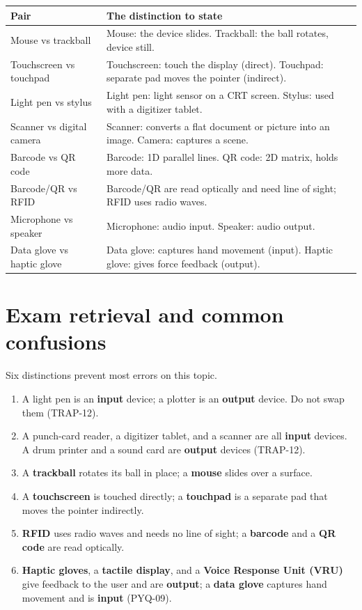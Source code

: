\documentclass[11pt]{article}
\begin{document}
\begin{center}
\begin{tabular}{p{}p{}}
\toprule
\textbf{Pair} & \textbf{The distinction to state} \\
\midrule
Mouse vs trackball & Mouse: the device slides. Trackball: the ball rotates, device still. \\
Touchscreen vs touchpad & Touchscreen: touch the display (direct). Touchpad: separate pad moves the pointer (indirect). \\
Light pen vs stylus & Light pen: light sensor on a CRT screen. Stylus: used with a digitizer tablet. \\
Scanner vs digital camera & Scanner: converts a flat document or picture into an image. Camera: captures a scene. \\
Barcode vs QR code & Barcode: 1D parallel lines. QR code: 2D matrix, holds more data. \\
Barcode/QR vs RFID & Barcode/QR are read optically and need line of sight; RFID uses radio waves. \\
Microphone vs speaker & Microphone: audio input. Speaker: audio output. \\
Data glove vs haptic glove & Data glove: captures hand movement (input). Haptic glove: gives force feedback (output). \\
\bottomrule
\end{tabular}
\end{center}

\section{Exam retrieval and common confusions}
Six distinctions prevent most errors on this topic.
\begin{enumerate}
  \item A light pen is an \textbf{input} device; a plotter is an \textbf{output}
    device. Do not swap them (TRAP-12).
  \item A punch-card reader, a digitizer tablet, and a scanner are all
    \textbf{input} devices. A drum printer and a sound card are
    \textbf{output} devices (TRAP-12).
  \item A \textbf{trackball} rotates its ball in place; a \textbf{mouse}
    slides over a surface.
  \item A \textbf{touchscreen} is touched directly; a \textbf{touchpad} is a
    separate pad that moves the pointer indirectly.
  \item \textbf{RFID} uses radio waves and needs no line of sight; a
    \textbf{barcode} and a \textbf{QR code} are read optically.
  \item \textbf{Haptic gloves}, a \textbf{tactile display}, and a
    \textbf{Voice Response Unit (VRU)} give feedback to the user and are
    \textbf{output}; a \textbf{data glove} captures hand movement and is
    \textbf{input} (PYQ-09).
\end{enumerate}
\end{document}
